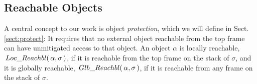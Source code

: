 %
%
% 
%
%
   
  \subsection{{Reachable  Objects}}

 {A central concept to our work is object \emph{protection}, which we will define in   Sect. \ref{sect:protect}: It requires that no external object  
reachable from the top frame  can have unmitigated access to that object.}
%
%
An object $\alpha$ is  locally reachable, $ \,Loc\_Reachbl(\,\alpha,\sigma\,) $, if it is reachable from the top frame on the stack of $\sigma$,
and it is globally reachable, $\,Glb\_Reachbl(\,\alpha,\sigma\,)$, if it is reachable from any  frame on the stack of $\sigma$.
 
